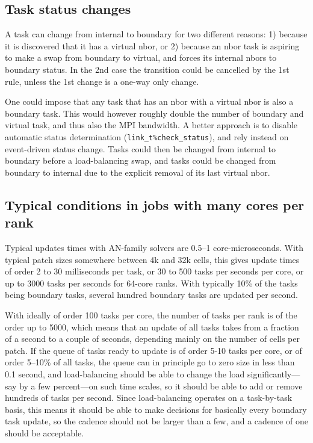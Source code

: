 \documentclass[paper=a4,fontsize=11pt]{scrartcl}
\numberwithin{equation}{section}		%
\numberwithin{figure}{section}			%
\numberwithin{table}{section}				%
\newcommand{\codecolor}{\color{Blue}}
\newcommand{\Code}[1]{{\codecolor\texttt{#1}}}
\begin{document}
\subsection{Task status changes}
A task can change from internal to boundary for two different reasons: 1) because it is discovered that it has a virtual nbor, or 2) because an nbor task is aspiring to make a swap from boundary to virtual, and forces its internal nbors to boundary status.  In the 2nd case the transition could be cancelled by the 1st rule, unless the 1st change is a one-way only change.

One could impose that any task that has an nbor with a virtual nbor is also a boundary task.  This would however roughly double the number of boundary and virtual task, and thus also the MPI bandwidth.  A better approach is to disable automatic status determination (\Code{link\_t\%check\_status}), and rely instead on event-driven status change.  Tasks could then be changed from internal to boundary before a load-balancing swap, and tasks could be changed from boundary to internal due to the explicit removal of its last virtual nbor. 

\subsection{Typical conditions in jobs with many cores per rank}

Typical updates times with AN-family solvers are 0.5--1 core-microseconds.  With typical patch sizes somewhere between 4k and 32k cells, this gives update times of order 2 to 30 milliseconds per task, or 30 to 500 tasks per seconds per core, or up to 3000 tasks per seconds for 64-core ranks.  With typically 10\% of the tasks being boundary tasks, several hundred boundary tasks are updated per second.  

With ideally of order 100 tasks per core, the number of tasks per rank is of the order up to 5000, which means that an update of all tasks takes from a fraction of a second to a couple of seconds, depending mainly on the number of cells per patch.  If the queue of tasks ready to update is of order 5-10 tasks per core, or of order 5--10\% of all tasks, the queue can in principle go to zero size in less than 0.1 second, and load-balancing should be able to change the load significantly---say by a few percent---on such time scales, so it should be able to add or remove hundreds of tasks per second.   Since load-balancing operates on a task-by-task basis, this means it should be able to make decisions for basically every boundary task update, so the cadence should not be larger than a few, and a cadence of one should be acceptable.
\end{document}
